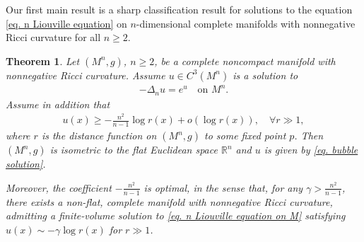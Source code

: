 \documentclass[12pt]{amsart}
\theoremstyle{plain}
\newtheorem{theorem}{Theorem}[section]
\theoremstyle{definition}
\theoremstyle{remark}     %
\begin{document}
 Our first main result is a sharp classification result for solutions to the  equation \cref{eq. n Liouville equation} on $n$-dimensional complete manifolds with nonnegative Ricci curvature for all $n\geq 2$.
 \begin{theorem}\label{thm. sharp classification}
     Let $(M^n,g)$, $n\geq 2$, be a complete noncompact manifold with nonnegative Ricci curvature. Assume $u\in C^3(M^n)$ is a solution to
     \begin{align}\label{eq. n Liouville equation on M}
         -\Delta_n u=e^u\quad 
         \text{on }M^n.
     \end{align}
     Assume in addition that
     \begin{align}\label{eq. sharp logarithmic lower bound}
         u(x)\geq -\frac{n^2}{n-1}\log r(x)
         +o(\log r(x)),\quad \forall r\gg 1,
     \end{align}
     where $r$ is the distance function on $(M^n,g)$ to some fixed point $p$. Then $(M^n,g)$ is isometric to the flat Euclidean space $\mathbb{R}^n$ and $u$ is given by \cref{eq. bubble solution}.

     Moreover, the coefficient $-\frac{n^2}{n-1}$ is optimal, in the sense that, for any $\gamma>\frac{n^2}{n-1}$, there exists a non-flat, complete manifold with nonnegative Ricci curvature, admitting a finite-volume solution to  \cref{eq. n Liouville equation on M} satisfying $u(x)\sim -\gamma\log r(x)$ for $r\gg 1$.
 \end{theorem}
   
\end{document}
